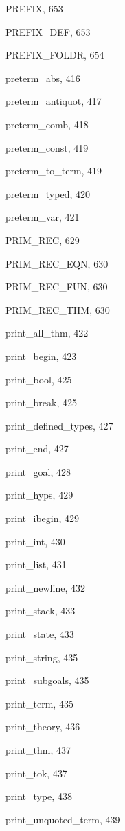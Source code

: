 \begin{theindex}
  \item {\ptt PREFIX}, 653
  \item {\ptt PREFIX\_DEF}, 653
  \item {\ptt PREFIX\_FOLDR}, 654
  \item {\ptt preterm\_abs}, 416
  \item {\ptt preterm\_antiquot}, 417
  \item {\ptt preterm\_comb}, 418
  \item {\ptt preterm\_const}, 419
  \item {\ptt preterm\_to\_term}, 419
  \item {\ptt preterm\_typed}, 420
  \item {\ptt preterm\_var}, 421
  \item {\ptt PRIM\_REC}, 629
  \item {\ptt PRIM\_REC\_EQN}, 630
  \item {\ptt PRIM\_REC\_FUN}, 630
  \item {\ptt PRIM\_REC\_THM}, 630
  \item {\ptt print\_all\_thm}, 422
  \item {\ptt print\_begin}, 423
  \item {\ptt print\_bool}, 425
  \item {\ptt print\_break}, 425
  \item {\ptt print\_defined\_types}, 427
  \item {\ptt print\_end}, 427
  \item {\ptt print\_goal}, 428
  \item {\ptt print\_hyps}, 429
  \item {\ptt print\_ibegin}, 429
  \item {\ptt print\_int}, 430
  \item {\ptt print\_list}, 431
  \item {\ptt print\_newline}, 432
  \item {\ptt print\_stack}, 433
  \item {\ptt print\_state}, 433
  \item {\ptt print\_string}, 435
  \item {\ptt print\_subgoals}, 435
  \item {\ptt print\_term}, 435
  \item {\ptt print\_theory}, 436
  \item {\ptt print\_thm}, 437
  \item {\ptt print\_tok}, 437
  \item {\ptt print\_type}, 438
  \item {\ptt print\_unquoted\_term}, 439

\end{theindex}

